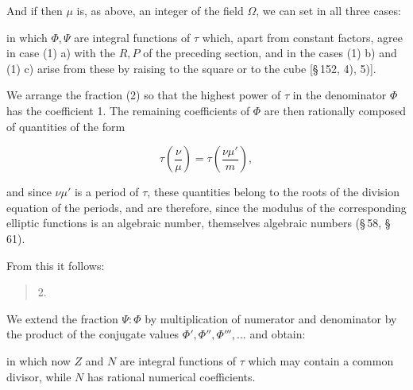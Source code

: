 

And if then $\mu$ is, as above, an integer of the field $\Omega$, we can set in all three cases:


in which $\Phi, \Psi$ are integral functions of $\tau$ which, apart from constant factors, agree in case (1) a) with the $R, P$ of the preceding section, and in the cases (1) b) and (1) c) arise from these by raising to the square or to the cube [§\,152, 4), 5)].

We arrange the fraction (2) so that the highest power of $\tau$ in the denominator $\Phi$ has the coefficient 1. The remaining coefficients of $\Phi$ are then rationally composed of quantities of the form

\[
\tau\left(\frac{\nu}{\mu}\right) = \tau\left(\frac{\nu \mu'}{m}\right),
\]

and since $\nu\mu'$ is a period of $\tau$, these quantities belong to the roots of the division equation of the periods, and are therefore, since the modulus of the corresponding elliptic functions is an algebraic number, themselves algebraic numbers (§\,58, §\,61).

From this it follows:

\begin{quote}
2. 
\end{quote}

We extend the fraction $\Psi : \Phi$ by multiplication of numerator and denominator by the product of the conjugate values $\Phi', \Phi'', \Phi''', \ldots$ and obtain:


in which now $Z$ and $N$ are integral functions of $\tau$ which may contain a common divisor, while $N$ has rational numerical coefficients.
